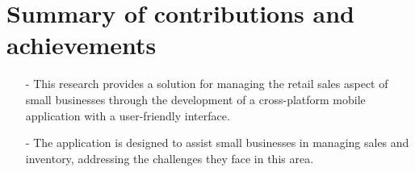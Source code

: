 \documentclass[../thesis.tex]{subfiles}
\begin{document}
\section{Summary of contributions and achievements}
\begin{itemize}
    \item[-] This research provides a solution for managing the retail sales aspect of small businesses through the development of a cross-platform mobile application with a user-friendly interface. 
    \item[-] The application is designed to assist small businesses in managing sales and inventory, addressing the challenges they face in this area. 
\end{itemize}
\end{document}

